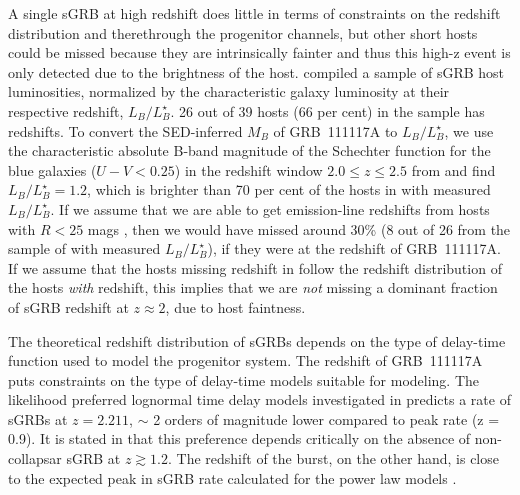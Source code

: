 \documentclass{aa}    %
\newcommand\todo[1]{\textbf{(#1)}}
\begin{document}
A single sGRB at high redshift does little in terms of constraints on the
redshift distribution and therethrough the progenitor channels, but other short
hosts could be missed because they are intrinsically fainter and thus this
high-z event is only detected due to the brightness of the host.
\citet{Berger2014} compiled a sample of sGRB host luminosities, normalized by
the characteristic galaxy luminosity at their respective redshift,
$L_B/L^{\star}_{B}$. 26 out of 39 hosts (66 per cent) in the sample has
redshifts. To convert the SED-inferred $M_B$ of GRB~111117A to
$L_B/L^{\star}_{B}$, we use the characteristic absolute B-band magnitude of the
Schechter function for the blue galaxies ($U - V < 0.25$) in the redshift window
$2.0 \leq z \leq 2.5$ from \citet{Marchesini2007} and find $L_B/L^{\star}_{B} =
1.2$, which is brighter than 70 per cent of the hosts in \citet{Berger2014} with
measured $L_B/L^{\star}_{B}$. If we assume that we are able to get emission-line
redshifts from hosts with $R < 25$ mags \citep{Kruhler2012}, then we would have
missed around 30\% (8 out of 26 from the sample of \citealt{Berger2014} with
measured $L_B/L^{\star}_{B}$), if they were at the redshift of GRB~111117A. If
we assume that the hosts missing redshift in \citet{Berger2014} follow the
redshift distribution of the hosts \textit{with} redshift, this implies that we
are \textit{not} missing a dominant fraction of sGRB redshift at $z \approx 2$,
due to host faintness.

The theoretical redshift distribution of sGRBs depends on the type of delay-time
function used to model the progenitor system. The redshift of GRB~111117A puts
constraints on the type of delay-time models suitable for modeling. The
likelihood preferred lognormal time delay models investigated in
\citet{Wanderman2015} predicts a rate of sGRBs at $z = 2.211$, $\sim$ 2 orders
of magnitude lower compared to peak rate (z = 0.9). It is stated in
\citet{Wanderman2015} that this preference depends critically on the absence of
non-collapsar sGRB at $z \gtrsim 1.2$. The redshift of the burst, on the other
hand, is close to the expected peak in sGRB rate calculated for the power law
models \citep{Behroozi2014, Wanderman2015}.



\end{document}

